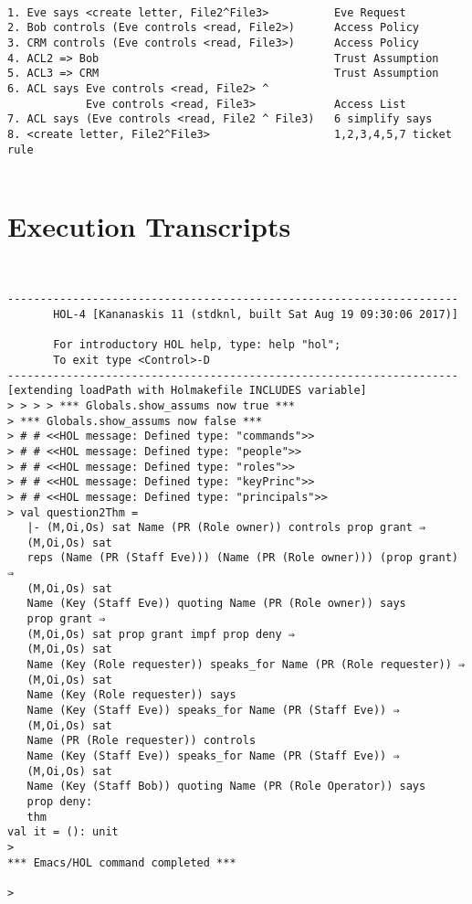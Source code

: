 \documentclass{report}
\begin{document}
\lstset{frameround=tttt}
\begin{lstlisting}[frame=tRBL]

1. Eve says <create letter, File2^File3>          Eve Request
2. Bob controls (Eve controls <read, File2>)      Access Policy
3. CRM controls (Eve controls <read, File3>)      Access Policy
4. ACL2 => Bob                                    Trust Assumption
5. ACL3 => CRM                                    Trust Assumption
6. ACL says Eve controls <read, File2> ^
            Eve controls <read, File3>            Access List
7. ACL says (Eve controls <read, File2 ^ File3)   6 simplify says
8. <create letter, File2^File3>                   1,2,3,4,5,7 ticket rule
   
\end{lstlisting}




\section{Execution Transcripts}
\label{sec:exec-transcr-2}

\setcounter{sessioncount}{0}
\begin{session}
  \begin{scriptsize}
\begin{verbatim}


---------------------------------------------------------------------
       HOL-4 [Kananaskis 11 (stdknl, built Sat Aug 19 09:30:06 2017)]

       For introductory HOL help, type: help "hol";
       To exit type <Control>-D
---------------------------------------------------------------------
[extending loadPath with Holmakefile INCLUDES variable]
> > > > *** Globals.show_assums now true ***
> *** Globals.show_assums now false ***
> # # <<HOL message: Defined type: "commands">>
> # # <<HOL message: Defined type: "people">>
> # # <<HOL message: Defined type: "roles">>
> # # <<HOL message: Defined type: "keyPrinc">>
> # # <<HOL message: Defined type: "principals">>
> val question2Thm =
   |- (M,Oi,Os) sat Name (PR (Role owner)) controls prop grant ⇒
   (M,Oi,Os) sat
   reps (Name (PR (Staff Eve))) (Name (PR (Role owner))) (prop grant) ⇒
   (M,Oi,Os) sat
   Name (Key (Staff Eve)) quoting Name (PR (Role owner)) says
   prop grant ⇒
   (M,Oi,Os) sat prop grant impf prop deny ⇒
   (M,Oi,Os) sat
   Name (Key (Role requester)) speaks_for Name (PR (Role requester)) ⇒
   (M,Oi,Os) sat
   Name (Key (Role requester)) says
   Name (Key (Staff Eve)) speaks_for Name (PR (Staff Eve)) ⇒
   (M,Oi,Os) sat
   Name (PR (Role requester)) controls
   Name (Key (Staff Eve)) speaks_for Name (PR (Staff Eve)) ⇒
   (M,Oi,Os) sat
   Name (Key (Staff Bob)) quoting Name (PR (Role Operator)) says
   prop deny:
   thm
val it = (): unit
> 
*** Emacs/HOL command completed ***

>  

\end{verbatim}
  \end{scriptsize}
\end{session}
\end{document}
